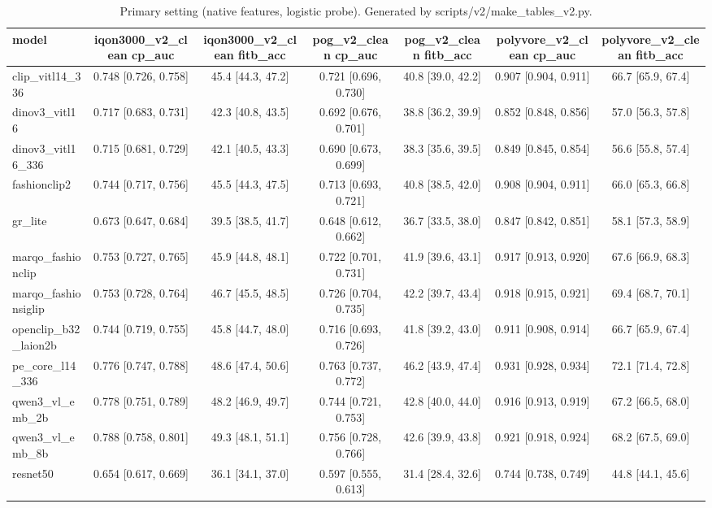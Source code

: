 \begin{table}[t]\centering\small
\caption{Primary setting (native features, logistic probe). Generated by scripts/v2/make_tables_v2.py.}\label{tab:v2-main}
\begin{tabular}{lcccccc}\toprule
model & iqon3000\_v2\_clean cp\_auc & iqon3000\_v2\_clean fitb\_acc & pog\_v2\_clean cp\_auc & pog\_v2\_clean fitb\_acc & polyvore\_v2\_clean cp\_auc & polyvore\_v2\_clean fitb\_acc \\\midrule
clip\_vitl14\_336 & 0.748 [0.726, 0.758] & 45.4 [44.3, 47.2] & 0.721 [0.696, 0.730] & 40.8 [39.0, 42.2] & 0.907 [0.904, 0.911] & 66.7 [65.9, 67.4] \\
dinov3\_vitl16 & 0.717 [0.683, 0.731] & 42.3 [40.8, 43.5] & 0.692 [0.676, 0.701] & 38.8 [36.2, 39.9] & 0.852 [0.848, 0.856] & 57.0 [56.3, 57.8] \\
dinov3\_vitl16\_336 & 0.715 [0.681, 0.729] & 42.1 [40.5, 43.3] & 0.690 [0.673, 0.699] & 38.3 [35.6, 39.5] & 0.849 [0.845, 0.854] & 56.6 [55.8, 57.4] \\
fashionclip2 & 0.744 [0.717, 0.756] & 45.5 [44.3, 47.5] & 0.713 [0.693, 0.721] & 40.8 [38.5, 42.0] & 0.908 [0.904, 0.911] & 66.0 [65.3, 66.8] \\
gr\_lite & 0.673 [0.647, 0.684] & 39.5 [38.5, 41.7] & 0.648 [0.612, 0.662] & 36.7 [33.5, 38.0] & 0.847 [0.842, 0.851] & 58.1 [57.3, 58.9] \\
marqo\_fashionclip & 0.753 [0.727, 0.765] & 45.9 [44.8, 48.1] & 0.722 [0.701, 0.731] & 41.9 [39.6, 43.1] & 0.917 [0.913, 0.920] & 67.6 [66.9, 68.3] \\
marqo\_fashionsiglip & 0.753 [0.728, 0.764] & 46.7 [45.5, 48.5] & 0.726 [0.704, 0.735] & 42.2 [39.7, 43.4] & 0.918 [0.915, 0.921] & 69.4 [68.7, 70.1] \\
openclip\_b32\_laion2b & 0.744 [0.719, 0.755] & 45.8 [44.7, 48.0] & 0.716 [0.693, 0.726] & 41.8 [39.2, 43.0] & 0.911 [0.908, 0.914] & 66.7 [65.9, 67.4] \\
pe\_core\_l14\_336 & 0.776 [0.747, 0.788] & 48.6 [47.4, 50.6] & 0.763 [0.737, 0.772] & 46.2 [43.9, 47.4] & 0.931 [0.928, 0.934] & 72.1 [71.4, 72.8] \\
qwen3\_vl\_emb\_2b & 0.778 [0.751, 0.789] & 48.2 [46.9, 49.7] & 0.744 [0.721, 0.753] & 42.8 [40.0, 44.0] & 0.916 [0.913, 0.919] & 67.2 [66.5, 68.0] \\
qwen3\_vl\_emb\_8b & 0.788 [0.758, 0.801] & 49.3 [48.1, 51.1] & 0.756 [0.728, 0.766] & 42.6 [39.9, 43.8] & 0.921 [0.918, 0.924] & 68.2 [67.5, 69.0] \\
resnet50 & 0.654 [0.617, 0.669] & 36.1 [34.1, 37.0] & 0.597 [0.555, 0.613] & 31.4 [28.4, 32.6] & 0.744 [0.738, 0.749] & 44.8 [44.1, 45.6] \\

\end{tabular}
\end{table}
